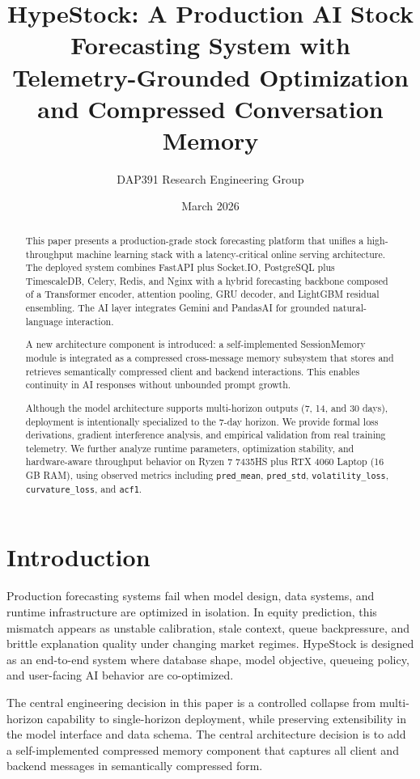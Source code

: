 \documentclass{article}
\title{\textbf{HypeStock: A Production AI Stock Forecasting System with Telemetry-Grounded Optimization and Compressed Conversation Memory}}
\author{DAP391 Research Engineering Group}
\date{March 2026}
\begin{document}
\maketitle

\begin{abstract}
This paper presents a production-grade stock forecasting platform that unifies a high-throughput machine learning stack with a latency-critical online serving architecture. The deployed system combines FastAPI plus Socket.IO, PostgreSQL plus TimescaleDB, Celery, Redis, and Nginx with a hybrid forecasting backbone composed of a Transformer encoder, attention pooling, GRU decoder, and LightGBM residual ensembling. The AI layer integrates Gemini and PandasAI for grounded natural-language interaction.

A new architecture component is introduced: a self-implemented SessionMemory module is integrated as a compressed cross-message memory subsystem that stores and retrieves semantically compressed client and backend interactions. This enables continuity in AI responses without unbounded prompt growth.

Although the model architecture supports multi-horizon outputs (7, 14, and 30 days), deployment is intentionally specialized to the 7-day horizon. We provide formal loss derivations, gradient interference analysis, and empirical validation from real training telemetry. We further analyze runtime parameters, optimization stability, and hardware-aware throughput behavior on Ryzen 7 7435HS plus RTX 4060 Laptop (16 GB RAM), using observed metrics including \texttt{pred\_mean}, \texttt{pred\_std}, \texttt{volatility\_loss}, \texttt{curvature\_loss}, and \texttt{acf1}.
\end{abstract}

\tableofcontents
\newpage

\section{Introduction}
Production forecasting systems fail when model design, data systems, and runtime infrastructure are optimized in isolation. In equity prediction, this mismatch appears as unstable calibration, stale context, queue backpressure, and brittle explanation quality under changing market regimes. HypeStock is designed as an end-to-end system where database shape, model objective, queueing policy, and user-facing AI behavior are co-optimized.

The central engineering decision in this paper is a controlled collapse from multi-horizon capability to single-horizon deployment, while preserving extensibility in the model interface and data schema. The central architecture decision is to add a self-implemented compressed memory component that captures all client and backend messages in semantically compressed form.
\end{document}
